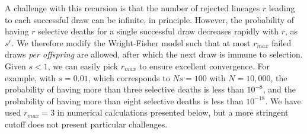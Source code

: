 \documentclass[9pt,twocolumn,twoside,lineno]{gsajnl}
\newcommand{\dslash}{/\!\!/}
\newcommand{\Coalc}[4]{\begin{bmatrix}#1\dslash #2 \\ #3\dslash #4 \end{bmatrix}}
\begin{document}


A challenge with this recursion is that the number of rejected lineages $r$ leading to each successful
draw can be infinite, in principle.
 However, the probability of having $r$ selective deaths for a single successful draw decreases
rapidly with $r$, as $s^r.$ We therefore modify the Wright-Fisher model such that at most $r_{max}$ failed
draws \emph{per offspring} are allowed, after which the next draw is immune to selection. Given
$s<1$, we can easily pick $r_{max}$ to ensure excellent convergence. For example, with $s=0.01$,
which corresponds to $Ns=100$ with $N=10,000$, the probability of having more than
three selective deaths is less than $10^{-8}$, and the probability of having more than eight selective deaths is
less than $10^{-18}.$ We have used $r_{max}=3$ in numerical calculations presented below, but a 
more stringent cutoff does not present particular challenges.
\end{document}
